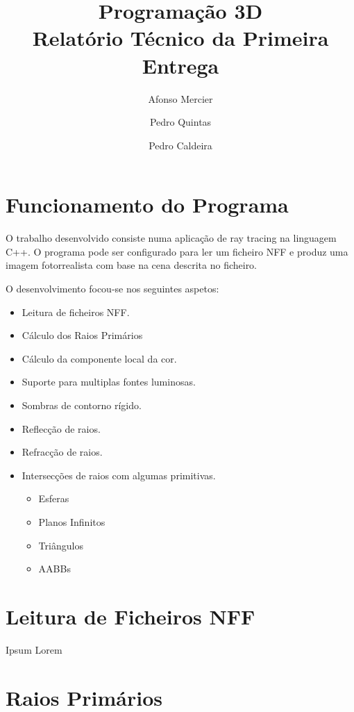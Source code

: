 \documentclass{article}
\title{
    \textbf{Programação 3D} \\
    Relatório Técnico da Primeira Entrega
}
\author{Afonso Mercier \and Pedro Quintas \and Pedro Caldeira}
\date{}
\begin{document}
    \maketitle

    \begin{multicols}{2}
    \section{Funcionamento do Programa}

    O trabalho desenvolvido consiste numa aplicação de ray tracing na linguagem
    C++. O programa pode ser configurado para ler um ficheiro NFF e produz uma
    imagem fotorrealista com base na cena descrita no ficheiro.

    O desenvolvimento focou-se nos seguintes aspetos:

    \begin{itemize}
        \item Leitura de ficheiros NFF.
        \item Cálculo dos Raios Primários
        \item Cálculo da componente local da cor.
        \item Suporte para multiplas fontes luminosas.
        \item Sombras de contorno rígido.
        \item Reflecção de raios.
        \item Refracção de raios.
        \item Intersecções de raios com algumas primitivas.
        \begin{itemize}
            \item Esferas
            \item Planos Infinitos
            \item Triângulos
            \item AABBs
        \end{itemize}
    \end{itemize}

    \section{Leitura de Ficheiros NFF}
    
    Ipsum Lorem

    \section{Raios Primários}


\end{multicols}
\end{document}
